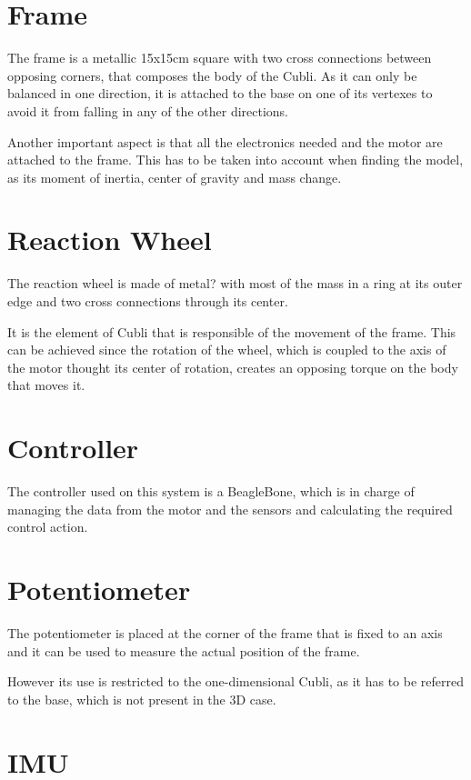 \section{Frame}
The frame is a metallic  15x15cm square with two cross connections between opposing corners, that composes the body of the Cubli. As it can only be balanced in one direction, it is attached to the base on one of its vertexes to avoid it from falling in any of the other directions.

Another important aspect is that all the electronics needed and the motor are attached to the frame. This has to be taken into account when finding the model, as its moment of inertia, center of gravity and mass change.


\section{Reaction Wheel}
The reaction wheel is made of metal?  with most of the mass in a ring at its outer edge and two cross connections through its center.

It is the element of Cubli that is responsible of the movement of the frame. This can be achieved since the rotation of the wheel, which is coupled to the axis of the motor thought its center of rotation, creates an opposing torque on the body that moves it.


\section{Controller}
The controller used on this system is a BeagleBone, which is in charge of managing the data from the motor and the sensors and calculating the required control action.


\section{Potentiometer}
The potentiometer is placed at the corner of the frame that is fixed to an axis and it can be used to measure the actual position of the frame.

However its use is restricted to the one-dimensional Cubli, as it has to be referred to the base, which is not present in the 3D case.


\section{IMU}


